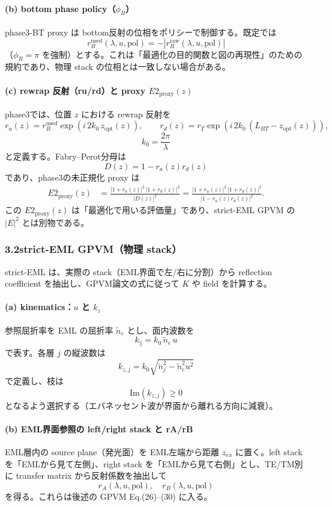 \documentclass[a4paper,11pt]{jsarticle} %
\begin{document}
\paragraph{(b) bottom phase policy（$\phi_B$）}
phase3-BT proxy は bottom反射の位相をポリシーで制御する。既定では
\[
r_B^{\mathrm{used}}(\lambda,u,\mathrm{pol})=-|r_B^{\mathrm{raw}}(\lambda,u,\mathrm{pol})|
\]
（$\phi_B=\pi$ を強制）とする。これは「最適化の目的関数と図の再現性」のための規約であり、物理 stack の位相とは一致しない場合がある。

\paragraph{(c) rewrap 反射（ru/rd）と proxy $E2_{\mathrm{proxy}}(z)$}
phase3では、位置 $z$ における rewrap 反射を
\[
r_u(z)=r_B^{\mathrm{used}}\exp\!\left(i\,2k_0\,z_{\mathrm{opt}}(z)\right),
\qquad
r_d(z)=r_T\exp\!\left(i\,2k_0\,(L_{BT}-z_{\mathrm{opt}}(z))\right),
\]
\[
k_0=\frac{2\pi}{\lambda}
\]
と定義する。Fabry--Perot分母は
\[
D(z)=1-r_u(z)r_d(z)
\]
であり、phase3の未正規化 proxy は
\begin{align}
E2_{\mathrm{proxy}}(z)
&=\frac{|1+r_u(z)|^2\,|1+r_d(z)|^2}{|D(z)|^2}
=\frac{|1+r_u(z)|^2\,|1+r_d(z)|^2}{|1-r_u(z)r_d(z)|^2}.
\label{eq:phase3_proxy}
\end{align}
この $E2_{\mathrm{proxy}}(z)$ は「最適化で用いる評価量」であり、strict-EML GPVM の $|E|^2$ とは別物である。

\subsubsection*{3.2\;strict-EML GPVM（物理 stack）}
strict-EML は、実際の stack（EML界面で左/右に分割）から reflection coefficient を抽出し、GPVM論文の式に従って $K$ や field を計算する。

\paragraph{(a) kinematics：$u$ と $k_z$}
参照屈折率を EML の屈折率 $\tilde n_e$ とし、面内波数を
\[
k_\parallel = k_0\,\tilde n_e\,u
\]
で表す。各層 $j$ の縦波数は
\[
k_{z,j} = k_0\sqrt{\tilde n_j^2-\tilde n_e^2u^2}
\]
で定義し、枝は
\[
\mathrm{Im}(k_{z,j})\ge 0
\]
となるよう選択する（エバネッセント波が界面から離れる方向に減衰）。

\paragraph{(b) EML界面参照の left/right stack と rA/rB}
EML層内の source plane（発光面）を EML左端から距離 $z_{ex}$ に置く。left stack を「EMLから見て左側」、right stack を「EMLから見て右側」とし、TE/TM別に transfer matrix から反射係数を抽出して
\[
r_A(\lambda,u,\mathrm{pol}),\quad r_B(\lambda,u,\mathrm{pol})
\]
を得る。これらは後述の GPVM Eq.(26)--(30) に入る。
\end{document}
